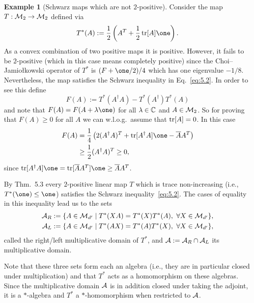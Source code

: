\documentclass[11pt,a4paper]{article}
\theoremstyle{plain}
\theoremstyle{definition}
\newtheorem{example}{Example}[section]
\theoremstyle{remark}
\numberwithin{equation}{section}
\begin{document}
\begin{example}[Schwarz maps which are not $2$-positive]
    Consider the map $T:\mathcal{M}_2 \to \mathcal{M}_2$ defined via
    \begin{equation}\label{eq:5.9}
        T^*(A) := \frac12\left(A^{T} + \frac12 \tr[A]\one\right).
    \end{equation}
    As a convex combination of two positive maps it is positive. However, it fails to be
    $2$-positive (which in this case means completely positive) since the
    Choi--Jamio\l kowski operator of $T^*$ is $(F+\one/2)/4$ which has one eigenvalue
    $-1/8$. Nevertheless, the map satisfies the Schwarz inequality in Eq.~\eqref{eq:5.2}.
    In order to see this define
    \[
        F(A) := T^*(A^\dagger A)-T^*(A^\dagger)T^*(A)
    \]
    and note that $F(A)=F(A+\lambda \one)$ for all $\lambda\in \mathbb{C}$ and $A\in \mathcal{M}_2$.
    So for proving that $F(A)\ge 0$ for all $A$ we can w.l.o.g.\ assume that $\operatorname{tr}[A]=0$.
    In this case
    \begin{equation}\label{eq:5.10}
        \begin{aligned}
            F(A)
             & = \frac14\left(2(A^\dagger A)^{T} + \tr[A^\dagger A]\one - \overline{A}A^{T}\right) \\
             & \ge \frac12 (A^\dagger A)^{T} \ge 0,
        \end{aligned}
    \end{equation}
    since $\tr[A^\dagger A]\one = \tr[\overline{A}A^{T}]\one \ge \overline{A}A^{T}$.
\end{example}

By Thm.~5.3 every $2$-positive linear map $T$ which is trace non-increasing (i.e.,
$T^*(\one)\le \one$) satisfies the Schwarz inequality~\eqref{eq:5.2}. The cases of
equality in this inequality lead us to the sets
\begin{align}
    \mathcal{A}_R
     &:= \{A\in \mathcal{M}_{d'} \mid T^*(XA)=T^*(X)T^*(A),\ \forall X\in \mathcal{M}_{d'}\},
    \label{eq:5.11}\\
    \mathcal{A}_L
     &:= \{A\in \mathcal{M}_{d'} \mid T^*(AX)=T^*(A)T^*(X),\ \forall X\in \mathcal{M}_{d'}\},
    \label{eq:5.12}
\end{align}
called the right/left multiplicative domain of $T^*$, and $\mathcal{A}:=\mathcal{A}_R\cap \mathcal{A}_L$
its multiplicative domain.

Note that these three sets form each an algebra (i.e., they are in particular closed
under multiplication) and that $T^*$ acts as a homomorphism on these algebras. Since
the multiplicative domain $\mathcal{A}$ is in addition closed under taking the adjoint, it
is a $*$-algebra and $T^*$ a $*$-homomorphism when restricted to $\mathcal{A}$.
\end{document}
